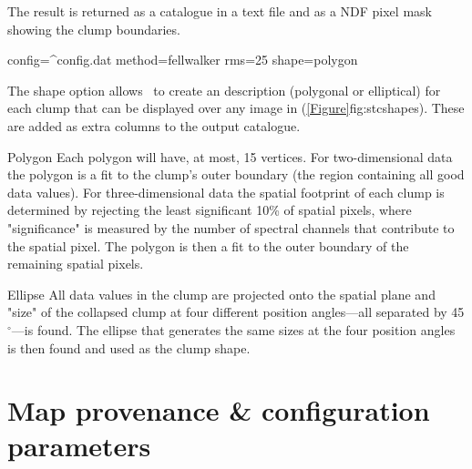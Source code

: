 The result is returned as a catalogue in a text file and as a NDF
pixel mask showing the clump boundaries.

\begin{terminalv}
  config=^config.dat method=fellwalker rms=25 shape=polygon
\end{terminalv}

The shape option allows \findclumps\ to create an
description (polygonal or elliptical) for each clump that
can be displayed over any image in \gaia (\cref{Figure}{fig:stcshapes}{}).
These are added as extra columns to the output catalogue.

\begin{aligndesc}
\item[Polygon] Each polygon will have, at most, 15 vertices. For
  two-dimensional data the polygon is a fit to the clump's outer
  boundary (the region containing all good data values). For
  three-dimensional data the spatial footprint of each clump is
  determined by rejecting the least significant 10\% of spatial
  pixels, where "significance" is measured by the number of spectral
  channels that contribute to the spatial pixel. The polygon is then a
  fit to the outer boundary of the remaining spatial pixels.

\item[Ellipse] All data values in the clump are projected onto the
  spatial plane and "size" of the collapsed clump at four different
  position angles---all separated by 45$^\circ$---is found. The
  ellipse that generates the same sizes at the four position angles is
  then found and used as the clump shape.
\end{aligndesc}



\section{Map provenance \& configuration parameters}
\label{sec:prov}

